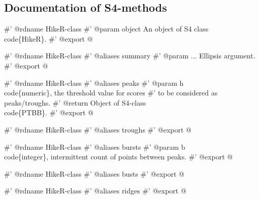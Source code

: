 \documentclass[a4paper]{article}
\begin{document}
\subsection{Documentation of S4-methods}
\label{S5SS3}

\nwenddocs{}\endmoddef
#' @rdname HikeR-class
#' @param object An object of S4 class \\code\{HikeR\}.
#' @export
\nwendcode{}@

\nwenddocs{}\endmoddef
#' @rdname HikeR-class
#' @aliases summary
#' @param ... Ellipsis argument.
#' @export
\nwendcode{}@

\nwenddocs{}\endmoddef
#' @rdname HikeR-class
#' @aliases peaks
#' @param h \\code\{numeric\}, the threshold value for scores
#' to be considered as peaks/troughs.
#' @return Object of S4-class \\code\{PTBB\}.
#' @export
\nwendcode{}@

\nwenddocs{}\endmoddef
#' @rdname HikeR-class
#' @aliases troughs
#' @export
\nwendcode{}@

\nwenddocs{}\endmoddef
#' @rdname HikeR-class
#' @aliases bursts
#' @param b \\code\{integer\}, intermittent count of points between peaks.
#' @export
\nwendcode{}@

\nwenddocs{}\endmoddef
#' @rdname HikeR-class
#' @aliases busts
#' @export
\nwendcode{}@

\nwenddocs{}\endmoddef
#' @rdname HikeR-class
#' @aliases ridges
#' @export
\nwendcode{}@
\end{document}
